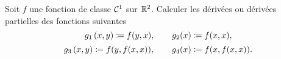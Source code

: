 \documentclass{magnolia}
\begin{document}
Soit $f$ une fonction de classe $\mathcal{C}^{1}$ sur $\mathbb{R}^2$. Calculer les dérivées
ou dérivées partielles des fonctions suivantes
\[g_1\left(x,y\right)\coloneqq f(y,x), \qquad g_2(x)\coloneqq f(x,x),\]
\[g_3\left(x,y\right)\coloneqq f(y,f(x,x)), \qquad g_4(x)\coloneqq f(x,f(x,x)).\]



\end{document}
